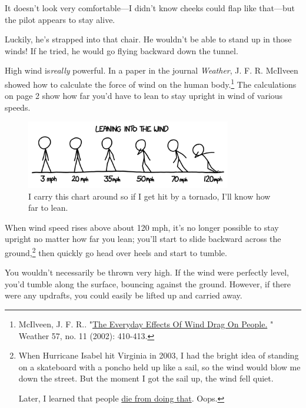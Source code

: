 {{It doesn't look very comfortable—I didn't know cheeks could flap like that—but the pilot appears to stay alive.}

{Luckily, he's strapped into that chair. He wouldn't be able to stand up in those winds! If he tried, he would go flying backward down the tunnel.}

{High wind is\emph{really} powerful. In a paper in the journal \emph{Weather}, J. F. R. McIlveen showed how to calculate the force of wind on the human body.{\footnote{McIlveen, J. F. R.. "\href{http://onlinelibrary.wiley.com/doi/10.1256/wea.29.02/pdf}{The Everyday Effects Of Wind Drag On People.} " Weather 57, no. 11 (2002): 410-413.} } The calculations on page 2 show how far you'd have to lean to stay upright in wind of various speeds.}

\begin{figure}[!htbp]
\centering
\includegraphics[scale=0.5, max width=0.8\textwidth]{imgs/a/66/wind_lean.png}
\caption{I carry this chart around so if I get hit by a tornado, I'll know how far to lean.}
\end{figure}

{When wind speed rises above about 120 mph, it's no longer possible to stay upright no matter how far you lean; you'll start to slide backward across the ground,{\footnote{When Hurricane Isabel hit Virginia in 2003, I had the bright idea of standing on a skateboard with a poncho held up like a sail, so the wind would blow me down the street. But the moment I got the sail up, the wind fell quiet.

Later, I learned that people \href{http://www.dailymail.co.uk/news/article-1327705/Kite-surfer-28-dies-gale-drags-100mph-beach-drops-50ft.html}{die from doing that}. Oops.} } then quickly go head over heels and start to tumble.}

{You wouldn't necessarily be thrown very high. If the wind were perfectly level, you'd tumble along the surface, bouncing against the ground. However, if there were any updrafts, you could easily be lifted up and carried away.}

}
